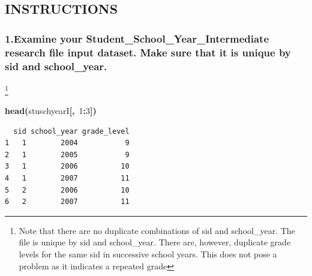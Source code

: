 \documentclass[12pt]{article}
\makeatletter
\newcommand{\hlnumber}[1]{\textcolor[rgb]{0,0,0}{#1}}%
\newcommand{\hlfunctioncall}[1]{\textcolor[rgb]{0.501960784313725,0,0.329411764705882}{\textbf{#1}}}%
\newcommand{\hlkeyword}[1]{\textcolor[rgb]{0,0,0}{\textbf{#1}}}%
\newcommand{\hlsymbol}[1]{\textcolor[rgb]{0,0,0}{#1}}%
\newenvironment{kframe}{%
 \def\FrameCommand##1{\hskip\@totalleftmargin \hskip-\fboxsep
 \colorbox{shadecolor}{##1}\hskip-\fboxsep
     \hskip-\linewidth \hskip-\@totalleftmargin \hskip\columnwidth}%
 \MakeFramed {\advance\hsize-\width
   \@totalleftmargin\z@ \linewidth\hsize
   \@setminipage}}%
 {\par\unskip\endMakeFramed}
\newenvironment{knitrout}{}{} %
\renewenvironment{knitrout}{\begin{footnotesize}}{\end{footnotesize}}
\makeatother
\begin{document}
\subsection{INSTRUCTIONS}

\subsubsection{1.Examine your Student\_School\_Year\_Intermediate research file input dataset. Make sure that it is unique by sid and school\_year.}\footnote{Note that there are no duplicate combinations of sid and school\_year.  The file is unique by sid and school\_year. There are, however, duplicate grade levels for the same sid in successive school years. This does not pose a problem as it indicates a repeated grade}

\begin{knitrout}
\color{fgcolor}\begin{kframe}
\begin{flushleft}
\ttfamily\noindent
\hlfunctioncall{head}\hlkeyword{(}\hlsymbol{stuschyearI}\hlkeyword{[}\hlkeyword{,}{\ }\hlnumber{1}\hlkeyword{:}\hlnumber{3}\hlkeyword{]}\hlkeyword{)}\mbox{}
\normalfont
\end{flushleft}
\begin{verbatim}
  sid school_year grade_level
1   1        2004           9
2   1        2005           9
3   1        2006          10
4   1        2007          11
5   2        2006          10
6   2        2007          11
\end{verbatim}
\end{kframe}
\end{knitrout}
\end{document}
